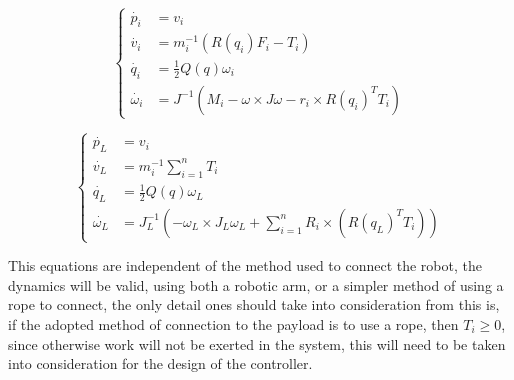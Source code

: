 \begin{equation}
    \begin{cases}
        \dot{p_i} &= v_{i} \\
        \dot{v_i} &= m_i ^{-1}(R(q_i)F_i - T_i) \\
        \dot{q_i} &= \frac{1}{2}Q(q) \omega_i \\
        \dot{\omega_i} &=J^{-1}(M_i - \omega \times J \omega - r_i \times R(q_i)^T T_i)
    \end{cases}
    \label{eq:Proposed Approach:Motion Model: Multiple Robot Dynamics: Robot Dynamics}
\end{equation}

\begin {equation}
    \begin{cases}
        \dot {p_{L}} &= v_{i} \\
        \dot {v_{L}} &= m_{i}^{-1} \sum_{i = 1}^{n} T_{i} \\
        \dot {q_{L}} &=  \frac{1}{2} Q(q) \omega_{L} \\
        \dot{\omega_{L}} &= J_{L}^{-1} (-\omega_{L} \times J_{L} \omega_{L} + \sum_{i = 1}^{n} R_{i} \times (R(q_{L})^T T_{i}))

    \end {cases}
    \label{eq:Proposed Approach:Motion Model: Multiple Robot Dynamics: Payload Dynamics}
\end{equation}

This equations are independent of the method used to connect the robot, the dynamics will be valid, using both a robotic arm, or a simpler method of using a rope to connect, the only detail ones should take into consideration from this is, if the adopted method of connection to the payload is to use a rope, then $T_i \geq 0$, since otherwise work will not be exerted in the system, this will need to be taken into consideration for the design of the controller.